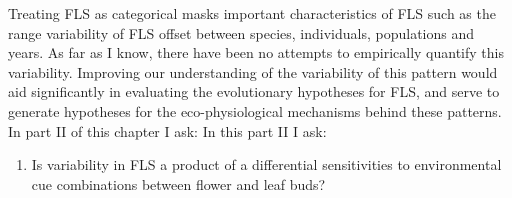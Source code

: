 \documentclass{article}\usepackage[]{graphicx}\usepackage[]{color}
\begin{document}
\indent\indent Treating FLS as categorical masks important characteristics of FLS such as the range variability of FLS offset between species, individuals, populations and years. As far as I know, there have been no attempts to empirically quantify this variability. Improving our understanding of the variability of this pattern would aid significantly in evaluating the evolutionary hypotheses for FLS, and serve to generate hypotheses for the eco-physiological mechanisms behind these patterns. In part II of this chapter I ask:
 In this part II I ask:
\begin{enumerate}
\item Is variability in FLS a product of a differential sensitivities to environmental cue combinations between flower and leaf buds?
\end{enumerate}
\end{document}
